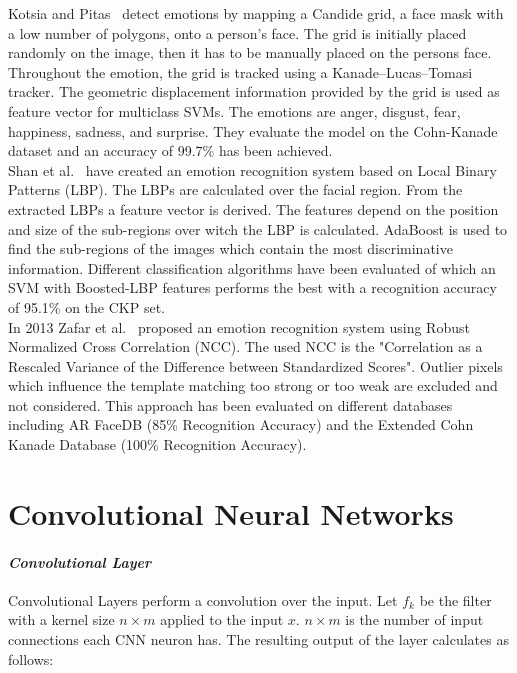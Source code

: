 \documentclass[10pt,journal,compsoc, hidelinks]{IEEEtran}
\newcommand{\paraV}{\vspace{1em}}
\begin{document}
Kotsia and Pitas~\cite{4032815} detect emotions by mapping a Candide grid, a face mask with a low number of polygons, onto a person's face. The grid is initially placed randomly on the image, then it has to be manually placed on the persons face. 
Throughout the emotion, the grid is tracked using a Kanade–Lucas–Tomasi tracker. The geometric displacement information provided by the grid is used as feature vector for multiclass SVMs. The emotions are anger, disgust, fear, happiness, sadness, and surprise. They evaluate the model on the Cohn-Kanade dataset and an accuracy of 99.7\% has been achieved.\\
Shan et al.~\cite{Shan2009803} have created an emotion recognition system based on Local Binary Patterns (LBP). The LBPs are calculated over the facial region. From the extracted LBPs a feature vector is derived. The features depend on the position and size of the sub-regions over witch the LBP is calculated. AdaBoost is used to find the sub-regions of the images which contain the most discriminative information. Different classification algorithms have been evaluated of which an SVM with Boosted-LBP features performs the best with a recognition accuracy of 95.1\% on the CKP set.\\
In 2013 Zafar et al.~\cite{6743520} proposed an emotion recognition system using Robust Normalized Cross Correlation (NCC). The used NCC is the "Correlation as a Rescaled Variance of the Difference between Standardized Scores". Outlier pixels which influence the template matching too strong or too weak are excluded and not considered. This approach has been evaluated on different databases including AR FaceDB (85\% Recognition Accuracy) and the Extended Cohn Kanade Database (100\% Recognition Accuracy).\\




 \section{Convolutional Neural Networks}
\label{sec:background}

\paraV
\paragraph{\textit{Convolutional Layer}}
Convolutional Layers perform a convolution over the input. Let $f_k$ be the filter with a kernel size $n\times m$ applied to the input $x$. $n \times m$ is the number of input connections each CNN neuron has. The resulting output of the layer calculates as follows: 
\end{document}
